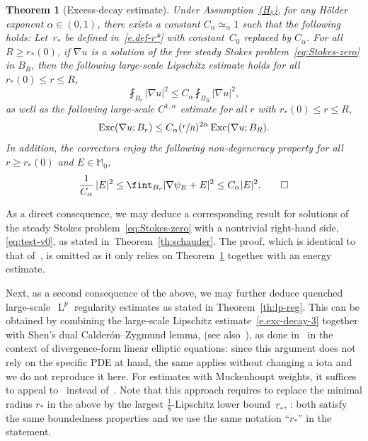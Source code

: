 \documentclass[JEP,XML,SOM,Unicode,published]{cedram}
\newcommand{\Hd}{\hyperref[Hd]{\textup{(H$_\delta$)}}\xspace}
\theoremstyle{plain}
\newtheorem{theor}{Theorem}[section]
\theoremstyle{definition}
\newcommand{\Exc}{\operatorname{Exc}}
\newcommand{\Md}{\mathbb M}
\newcommand{\Ld}{\operatorname{L}}
\begin{document}
\begin{theor}[Excess-decay estimate]\label{th:excess-decay}
Under Assumption~\Hd, for any Hölder exponent $\alpha \in (0,1)$, there exists a constant $C_\alpha\simeq_\alpha1$ such that the following holds: Let~$r_*$ be defined in~\eqref{e.def-r*} with constant~$C_0$ replaced by $C_\alpha$.
For all $R\ge r_*(0)$, if $\nabla u$ is a solution of the free steady Stokes problem~\eqref{eq:Stokes-zero} in $B_R$,
then the following large-scale Lipschitz estimate holds for all $r_*(0)\le r\le R$,
\begin{equation}\label{e.exc-decay-3}
\fint_{B_r} |\nabla u|^2 \le C_\alpha \fint_{B_R}|\nabla u|^2,
\end{equation}
as well as the following large-scale $C^{1,\alpha}$ estimate for all $r$ with  $r_*(0)\le r\le R$,
\begin{equation*}
\Exc(\nabla u;B_r)\le C_\alpha (\sfrac r R)^{2\alpha} \Exc(\nabla u;B_R).
\end{equation*}
In addition, the correctors enjoy the following non-degeneracy property for all $r\ge r_*(0)$ and $E\in\Md_0$,
\begin{equation*}
\frac1{C_\alpha}\, |E|^2 \le \fint_{B_r} |\nabla \psi_E+E|^2 \le C_\alpha |E|^2.\qedhere
\end{equation*}
\end{theor}

As a direct consequence, we may deduce a corresponding result for solutions of the steady Stokes problem~\eqref{eq:Stokes-zero} with a nontrivial right-hand side, \cf \eqref{eq:test-v0}, as stated in~Theorem~\ref{th:schauder}.
The proof, which is identical to that of~\cite[Cor.\,3]{GNO-reg}, is omitted as it only relies on Theorem~\ref{th:excess-decay} together with an energy estimate.

Next, as a second consequence of the above, we may further deduce quenched large-scale~$\Ld^p$ regularity estimates as stated in Theorem~\ref{th:lp-reg}.
This can be obtained by combining the large-scale Lipschitz estimate~\eqref{e.exc-decay-3} together with Shen's dual Calderón--Zygmund lemma, \cf \cite[Th.\,3.2]{Shen-07} (see also~\cite[Th.\,2.4]{Shen-12}), as done in~\cite[\S 6.1]{DO1} in the context of divergence-form linear elliptic equations: since this argument does not rely on the specific PDE at hand, the same applies without changing a iota and we do not reproduce it here. For estimates with Muckenhoupt weights, it suffices to appeal to~\cite[Th.\,3.4 \& Rem.\,3.5]{Shen-07} instead of~\cite[Th.\,3.2]{Shen-07}.
Note that this approach requires to replace the minimal radius $r_*$ in the above by the largest $\frac18$-Lipschitz lower bound~$\underline r_*$, \cf \cite[\S 3.7]{GNO-reg}: both satisfy the same boundedness properties and we use the same notation ``$r_*$'' in the statement.
\end{document}
